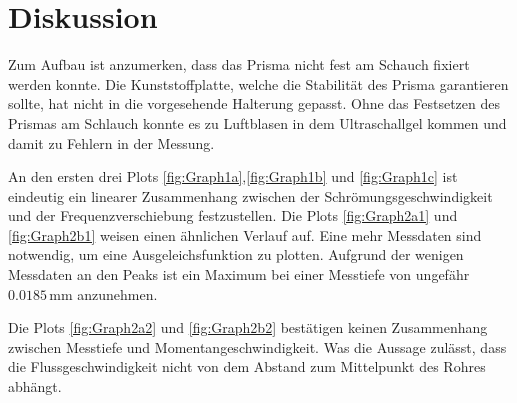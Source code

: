 \section{Diskussion}
\label{sec:diskussion}

Zum Aufbau ist anzumerken, dass das Prisma nicht fest am Schauch fixiert werden konnte. Die Kunststoffplatte, welche die Stabilität des Prisma garantieren sollte, hat nicht in die vorgesehende Halterung gepasst.
Ohne das Festsetzen des Prismas am Schlauch konnte es zu Luftblasen in dem Ultraschallgel kommen und damit zu Fehlern in der Messung.

An den ersten drei Plots \autoref{fig:Graph1a},\autoref{fig:Graph1b} und \autoref{fig:Graph1c} ist eindeutig ein linearer Zusammenhang zwischen der Schrömungsgeschwindigkeit und der Frequenzverschiebung festzustellen.
Die Plots \autoref{fig:Graph2a1} und \autoref{fig:Graph2b1} weisen einen ähnlichen Verlauf auf. 
Eine mehr Messdaten sind notwendig, um eine Ausgeleichsfunktion zu plotten. Aufgrund der wenigen Messdaten an den Peaks ist ein Maximum bei einer Messtiefe von ungefähr $0.0185  \, \unit{\milli\meter}$ anzunehmen.

Die Plots \autoref{fig:Graph2a2} und \autoref{fig:Graph2b2} bestätigen keinen Zusammenhang zwischen Messtiefe und Momentangeschwindigkeit.
Was die Aussage zulässt, dass die Flussgeschwindigkeit nicht von dem Abstand zum Mittelpunkt des Rohres abhängt.